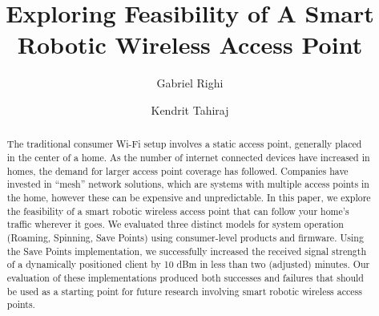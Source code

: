 \documentclass[sigconf]{acmart}
\begin{document}
\title{Exploring Feasibility of A Smart Robotic Wireless Access Point}


\author{Gabriel Righi \and Kendrit Tahiraj}

\renewcommand{\shortauthors}{Gabriel Righi \and Kendrit Tahiraj}

\begin{abstract}
    The traditional consumer Wi-Fi setup involves a static access point, generally placed in the center of a home. As the number of internet connected devices have increased in homes, the demand for larger access point coverage has followed. Companies have invested in “mesh” network solutions, which are systems with multiple access points in the home, however these can be expensive and unpredictable. In this paper, we explore the feasibility of a smart robotic wireless access point that can follow your home’s traffic wherever it goes. We evaluated three distinct models for system operation (Roaming, Spinning, Save Points) using consumer-level products and firmware. Using the Save Points implementation, we successfully increased the received signal strength of a dynamically positioned client by 10 dBm in less than two (adjusted) minutes. Our evaluation of these implementations produced both successes and failures that should be used as a starting point for future research involving smart robotic wireless access points.
\end{abstract}

\maketitle





\end{document}
